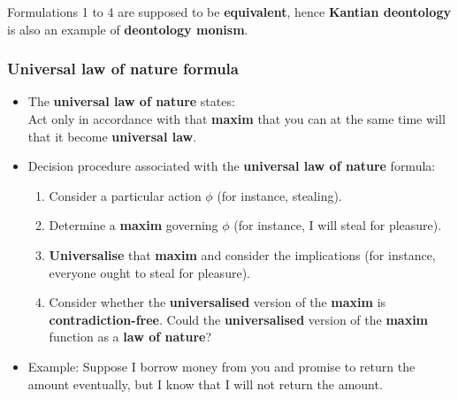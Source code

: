 \documentclass[11pt]{article}
\begin{document}
Formulations 1 to 4 are supposed to be \textbf{equivalent}, hence \textbf{Kantian deontology} is also an example of \textbf{deontology monism}.

 \newpage
\subsubsection{Universal law of nature formula}
\label{sec:org3b6085a}
\begin{itemize}
\item The \textbf{universal law of nature} states:  \\
Act only in accordance with that \textbf{maxim} that you can at the same time will that it become \textbf{universal law}.
\item Decision procedure associated with the \textbf{universal law of nature} formula:
\begin{enumerate}
\item Consider a particular action \(\phi\) (for instance, stealing).
\item Determine a \textbf{maxim} governing \(\phi\) (for instance, I will steal for pleasure).
\item \textbf{Universalise} that \textbf{maxim} and consider the implications (for instance, everyone ought to steal for pleasure).
\item Consider whether the \textbf{universalised} version of the \textbf{maxim} is \textbf{contradiction-free}. Could the \textbf{universalised} version of the \textbf{maxim} function as a \textbf{law of nature}?
\end{enumerate}
\item Example:
Suppose I borrow money from you and promise to return the amount eventually, but I know that I will not return the amount.
\end{itemize}

 \newpage
\end{document}
